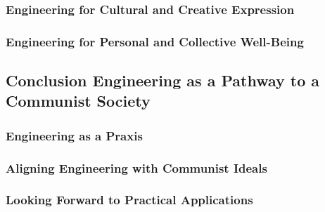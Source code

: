\subsubsection{Engineering for Cultural and Creative Expression}

\subsubsection{Engineering for Personal and Collective Well-Being}

\newpage

\subsection{Conclusion Engineering as a Pathway to a Communist Society}

\subsubsection{Engineering as a Praxis}

\subsubsection{Aligning Engineering with Communist Ideals}

\subsubsection{Looking Forward to Practical Applications}

\newpage


